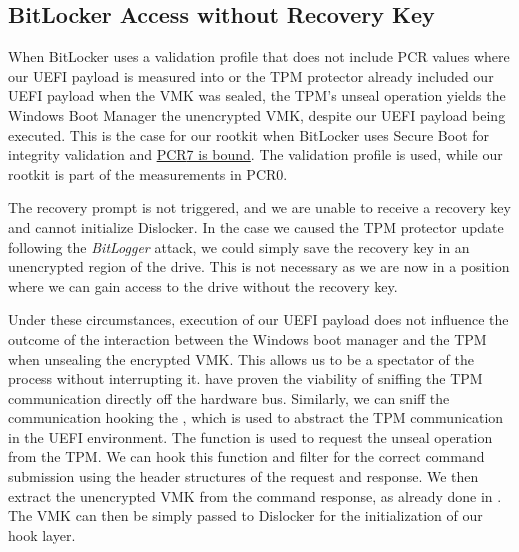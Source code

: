 \subsection{BitLocker Access without Recovery Key}
\label{sec:attacks:bitlocker:bitlocker-access-without-recovery-key}

When BitLocker uses a validation profile that does not include \ac{PCR} values where our \ac{UEFI} payload is measured into or the \ac{TPM} protector already included our \ac{UEFI} payload when the \ac{VMK} was sealed, the \ac{TPM}'s unseal operation yields the Windows Boot Manager the unencrypted \ac{VMK}, despite our \ac{UEFI} payload being executed.
This is the case for our rootkit when BitLocker uses Secure Boot for integrity validation and \hyperlink{pcr7-binding}{\ac{PCR}7 is bound}.
The validation profile \hyperref[tab:pcr-usage]{} is used, while our rootkit is part of the measurements in \ac{PCR}0.

The recovery prompt is not triggered, and we are unable to receive a recovery key and cannot initialize Dislocker.
In the case we caused the \ac{TPM} protector update following the \emph{BitLogger} attack, we could simply save the recovery key in an unencrypted region of the drive.
This is not necessary as we are now in a position where we can gain access to the drive without the recovery key.

Under these circumstances, execution of our \ac{UEFI} payload does not influence the outcome of the interaction between the Windows boot manager and the \ac{TPM} when unsealing the encrypted \ac{VMK}.
This allows us to be a spectator of the process without interrupting it.
\cite{tpm-spi-sniffing, tpm-lpc-sniffing} have proven the viability of sniffing the \ac{TPM} communication directly off the hardware bus.
Similarly, we can sniff the communication hooking the , which is used to abstract the \ac{TPM} communication in the \ac{UEFI} environment.
The  function is used to request the unseal operation from the \ac{TPM}.
We can hook this function and filter for the correct command submission using the header structures of the request and response.
We then extract the unencrypted \ac{VMK} from the command response, as already done in \cite{tpm-lpc-sniffing}.
The \ac{VMK} can then be simply passed to Dislocker for the initialization of our hook layer.